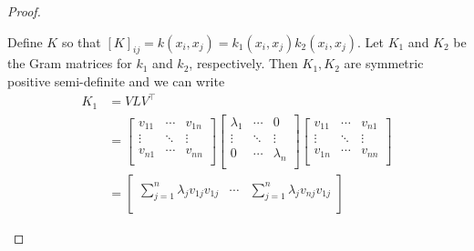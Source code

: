 \begin{proof}
\begin{enumerate}
        Define \(K\) so that \([K]_{ij} = k(x_i,x_j) = k_1(x_i, x_j) k_2(x_i, x_j)\).
        Let \(K_1\) and \(K_2\) be the Gram matrices for \(k_1\) and \(k_2\), respectively.
        Then \(K_1, K_2\) are symmetric positive semi-definite and we can write
        \def\dsum{\displaystyle\sum}
        \begin{align*}
            K_1 &= V LV^\top \\
            &= \begin{bmatrix}
                v_{11} & \cdots & v_{1n}\\
                \vdots & \ddots & \vdots\\
                v_{n1} & \cdots & v_{nn}\\
            \end{bmatrix}
            \begin{bmatrix}
                \lambda_{1} & \cdots & 0\\
                \vdots & \ddots & \vdots\\
                0 & \cdots & \lambda_{n}\\
            \end{bmatrix}
            \begin{bmatrix}
                v_{11} & \cdots & v_{n1}\\
                \vdots & \ddots & \vdots\\
                v_{1n} & \cdots & v_{nn}\\
            \end{bmatrix}\\
            &= \begin{bmatrix}
                \dsum_{j=1}^{n} \lambda_{j} v_{1j} v_{1j} & \cdots & \dsum_{j=1}^{n} \lambda_{j} v_{nj} v_{1j} \\

\end{bmatrix}
\end{align*}
\end{enumerate}
\end{proof}
